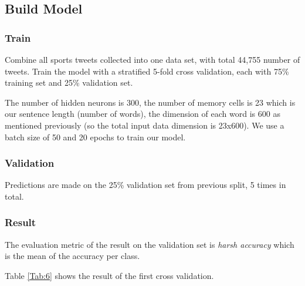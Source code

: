 \documentclass[journal, a4paper]{IEEEtran}
\begin{document}
\subsection{Build Model}
\subsubsection{Train}
Combine all sports tweets collected into one data set, with total 44,755 number of tweets. Train the model with a stratified 5-fold cross validation, each with 75\% training set and 25\% validation set. 

The number of hidden neurons is 300, the number of memory cells is 23 which is our sentence length (number of words), the dimension of each word is 600 as mentioned previously (so the total input data dimension is 23x600). We use a batch size of 50 and 20 epochs to train our model.\\ 
\subsubsection{Validation}
Predictions are made on the 25\% validation set from previous split, 5 times in total.\\
\subsubsection{Result}
The evaluation metric of the result on the validation set is \textit{harsh accuracy} which is the mean of the accuracy per class. 

Table \ref{Tab:6} shows the result of the first cross validation.
\begin{table}[ht]
	\caption{LSTM prediction result of 1st cross validation: confusion matrix and accuracy per class }\label{Tab:6}
\end{table}
\end{document}
